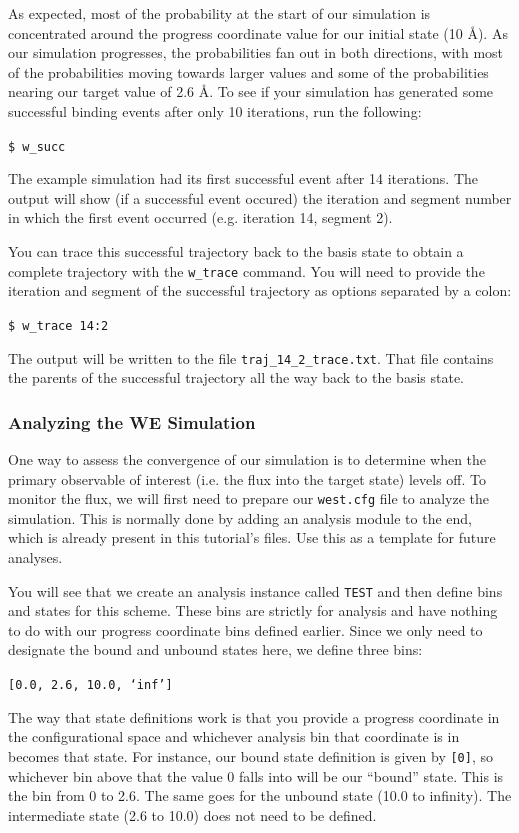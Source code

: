 \documentclass[9pt,tutorial,pubversion]{livecoms}
\begin{document}
As expected, most of the probability at the start of our simulation is concentrated around the progress coordinate value for our initial state (10 \AA). 
As our simulation progresses, the probabilities fan out in both directions, with most of the probabilities moving towards larger values and some of the probabilities nearing our target value of 2.6 \AA. 
To see if your simulation has generated some successful binding events after only 10 iterations, run the following:

\verb|$ w_succ|
 
The example simulation had its first successful event after 14 iterations. 
The output will show (if a successful event occured) the iteration and segment number in which the first event occurred (e.g. iteration 14, segment 2).

You can trace this successful trajectory back to the basis state to obtain a complete trajectory with the \verb|w_trace| command. 
You will need to provide the iteration and segment of the successful trajectory as options separated by a colon:
 
\verb|$ w_trace 14:2|
 
The output will be written to the file \verb|traj_14_2_trace.txt|. 
That file contains the parents of the successful trajectory all the way back to the basis state. 

\subsubsection{Analyzing the WE Simulation}

One way to assess the convergence of our simulation is to determine when the primary observable of interest (i.e. the flux into the target state) levels off. 
To monitor the flux, we will first need to prepare our \verb|west.cfg| file to analyze the simulation. 
This is normally done by adding an analysis module to the end, which is already present in this tutorial’s files. 
Use this as a template for future analyses.

You will see that we create an analysis instance called \verb|TEST| and then define bins and states for this scheme. 
These bins are strictly for analysis and have nothing to do with our progress coordinate bins defined earlier. 
Since we only need to designate the bound and unbound states here, we define three bins:
 
\verb|[0.0, 2.6, 10.0, ‘inf’]|
 
The way that state definitions work is that you provide a progress coordinate in the configurational space and whichever analysis bin that coordinate is in becomes that state. 
For instance, our bound state definition is given by \verb|[0]|, so whichever bin above that the value 0 falls into will be our “bound” state. 
This is the bin from 0 to 2.6. 
The same goes for the unbound state (10.0 to infinity). 
The intermediate state (2.6 to 10.0) does not need to be defined.
\end{document}
